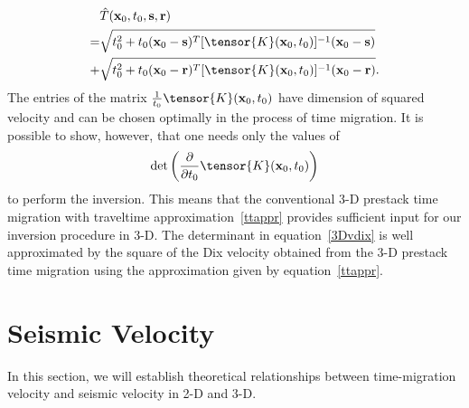 \begin{description}
\begin{eqnarray}
\label{3dappr}
&\hat{T}(\mathbf{x}_0,t_0,\mathbf{s},\mathbf{r})\nonumber \\
=&
\sqrt{t_0^2+t_0(\mathbf{x}_0-\mathbf{s})^T
[\tensor{K}(\mathbf{x}_0,t_0)]^{-1}(\mathbf{x}_0-\mathbf{s})}\\
+&\sqrt{t_0^2+t_0(\mathbf{x}_0-\mathbf{r})^T
[\tensor{K}(\mathbf{x}_0,t_0)]^{-1}(\mathbf{x}_0-\mathbf{r})}.\nonumber
\end{eqnarray}
The entries of the matrix $\frac{1}{t_0}\tensor{K}(\mathbf{x}_0,t_0)$
have dimension of squared velocity and can be chosen optimally in the
process of time migration.  
It is possible to show, however, that one needs only the values of
\begin{equation}
\label{3Dvdix}
\det\left(\frac{\partial }{\partial t_0}\tensor{K}(\mathbf{x}_0,t_0)\right)
\end{equation}
to perform the inversion. This means that the conventional 3-D
prestack time migration with traveltime approximation~\ref{ttappr}
provides sufficient input for our inversion procedure in 3-D.  The
determinant in equation~\ref{3Dvdix} is well approximated by the
square of the Dix velocity obtained from the 3-D prestack time
migration using the approximation given by equation~\ref{ttappr}.
\end{description}


\section{Seismic Velocity}
In this section, we will establish theoretical relationships between
time-migration velocity and seismic velocity in 2-D and 3-D.

